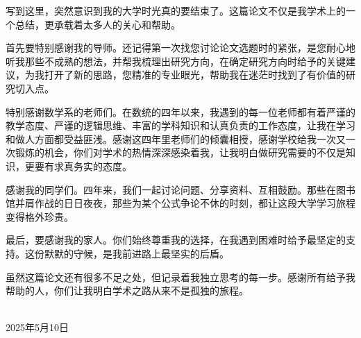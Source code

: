 
\acknowledgements


写到这里，突然意识到我的大学时光真的要结束了。这篇论文不仅是我学术上的一个总结，更承载着太多人的关心和帮助。

首先要特别感谢我的导师。还记得第一次找您讨论论文选题时的紧张，是您耐心地听我那些不成熟的想法，并帮我梳理出研究方向，在确定研究方向时给予的关键建议，为我打开了新的思路，您精准的专业眼光，帮助我在迷茫时找到了有价值的研究切入点。

特别感谢数学系的老师们。在数统的四年以来，我遇到的每一位老师都有着严谨的教学态度、严谨的逻辑思维、丰富的学科知识和认真负责的工作态度，让我在学习和做人方面都受益匪浅。感谢这四年里老师们的倾囊相授，感谢学校给我一次又一次锻炼的机会，你们对学术的热情深深感染着我，让我明白做研究需要的不仅是知识，更要有求真务实的态度。

感谢我的同学们。四年来，我们一起讨论问题、分享资料、互相鼓励。那些在图书馆并肩作战的日日夜夜，那些为某个公式争论不休的时刻，都让这段大学学习旅程变得格外珍贵。

最后，要感谢我的家人。你们始终尊重我的选择，在我遇到困难时给予最坚定的支持。这份默默的守候，是我前进路上最坚实的后盾。

虽然这篇论文还有很多不足之处，但记录着我独立思考的每一步。感谢所有给予我帮助的人，你们让我明白学术之路从来不是孤独的旅程。



\begin{signature}
   \\
  2025年5月10日
\end{signature}